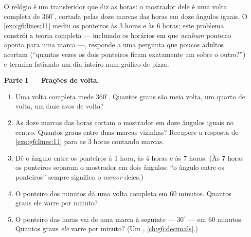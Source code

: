 \begin{problem}
\label{pb:g6:lines:1}
O relógio é um transferidor que diz as horas: o mostrador dele é uma
volta completa de $360^\circ$, cortada pelas doze marcas das horas em
doze ângulos iguais. O \cref{exo:g6:lines:11} mediu os ponteiros às
3 horas e às 6 horas; este problema constrói a teoria completa ---
incluindo os horários em que \emph{nenhum} ponteiro aponta para uma
marca ---, responde a uma pergunta que poucos adultos acertam
(``quantas vezes os dois ponteiros ficam exatamente um sobre o
outro?'') e termina fatiando um dia inteiro num gráfico de pizza.

\medskip
\noindent\textbf{Parte I --- Frações de volta.}
\begin{enumerate}
  \item Uma volta completa mede $360^\circ$. Quantos graus são meia
        volta, um quarto de volta, um doze avos de volta?
  \item As doze marcas das horas cortam o mostrador em doze ângulos
        iguais no centro. Quantos graus entre duas marcas vizinhas?
        Recupere a resposta do \cref{exo:g6:lines:11} para as 3 horas
        contando marcas.
  \item Dê o ângulo entre os ponteiros à 1 hora, às 4 horas e às
        7 horas. (Às 7 horas os ponteiros separam o mostrador em dois
        ângulos; ``o ângulo entre os ponteiros'' sempre significa o
        \emph{menor} deles.)
  \item O ponteiro dos minutos dá uma volta completa em $60$ minutos.
        Quantos graus ele varre por minuto?
  \item O ponteiro das horas vai de uma marca à seguinte ---
        $30^\circ$ --- em $60$ minutos. Quantos graus \emph{ele} varre
        por minuto? (Um ,
        \cref{ch:g6:decimals}.)
\end{enumerate}


\end{problem}
